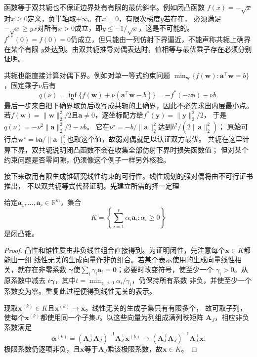 函数等于双共轭也不保证边界处有有限的最优斜率。例如闭凸函数
$f(x)=-\sqrt{x}$对$x\geq0$定义，负半轴取$+\infty$。在$x=0$，有限次梯度$y$若存在，
必须满足$-\sqrt{x}\geq yx$对所有$x>0$成立，即$y\leq-1/\sqrt{x}$，这是不可能的。
$f^{**}(0)=f(0)=0$仍成立，但只能由一列仿射下界逼近，不能声称共轭上确界在某个有限
$y$处达到。由双共轭推导对偶表达时，值相等与最优乘子存在必须分别证明。

共轭也能直接计算对偶下界。例如对单一等式约束问题
$\min_{\bm w}\{f(\bm w):\bm a^\top\bm w=b\}$，固定乘子$\nu$后有
\[
 q(\nu)=\inf_{\bm w}\{f(\bm w)+\nu(\bm a^\top\bm w-b)\}
       =-f^*(-\nu\bm a)-\nu b.
\]
最后一步来自把下确界取负后改写成共轭的上确界，因此不必先求出内层最小点。
若$f(\bm w)=\|\bm w\|_2^2/2$且$\bm a\neq0$，逐坐标配方给$f^*(\bm y)=\|\bm y\|_2^2/2$，
于是$q(\nu)=-\nu^2\|\bm a\|_2^2/2-\nu b$。
它在$\nu^\star=-b/\|\bm a\|_2^2$达到$b^2/(2\|\bm a\|_2^2)$；
原始可行点$\bm w^\star=b\bm a/\|\bm a\|_2^2$也取这个值，故弱对偶就足以认证双方最优。
共轭在这里计算下界，双共轭说明闭凸函数不会在收集全部仿射下界时损失函数值；
但对某个约束问题是否零间隙，仍须像这个例子一样另外核验。

接下来改用有限生成锥研究线性约束的可行性。线性规划的强对偶将由不可行证书推出，
不以双共轭等式代替证明。先建立所需的择一定理

\begin{lemma}[有限生成锥的闭性]
\label{lem:opt-finitely-generated-cone}
给定$\bm{a}_1,\ldots,\bm{a}_r\in\mathbb{R}^m$，集合
\[
  K=\left\{\sum_{i=1}^r\alpha_i\bm{a}_i:\alpha_i\geq0\right\}
\]
是闭凸锥。
\end{lemma}

\begin{proof}
凸性和锥性质由非负线性组合直接得到。为证明闭性，先注意每个$\bm{x}\in K$都能由一组
线性无关的生成向量作非负组合。若某个表示使用的生成向量线性相关，就存在非零系数
$\bm{\gamma}$使$\sum_i\gamma_i\bm{a}_i=\bm{0}$；必要时改变符号，使至少一个
$\gamma_i>0$。从原系数中减去
$t\bm{\gamma}$，其中$t=\min_{\gamma_i>0}\alpha_i/\gamma_i$，仍保持所有系数
非负，并使至少一个系数变为零。重复此过程便得到线性无关的表示。

现取$\bm{x}^{(k)}\in K$且$\bm{x}^{(k)}\to\bm{x}$。线性无关的生成子集只有有限多个，
故可取子列，使每个$\bm{x}^{(k)}$都使用同一个子集$J$。以这些向量为列组成满列秩矩阵
$\bm{A}_J$，相应非负系数满足
\[
  \bm{\alpha}^{(k)}
  =(\bm{A}_J^{\top}\bm{A}_J)^{-1}\bm{A}_J^{\top}\bm{x}^{(k)}
  \longrightarrow
  (\bm{A}_J^{\top}\bm{A}_J)^{-1}\bm{A}_J^{\top}\bm{x}.
\]
极限系数仍逐项非负，且$\bm{x}$等于$\bm{A}_J$乘该极限系数，故$\bm{x}\in K$。
\end{proof}

